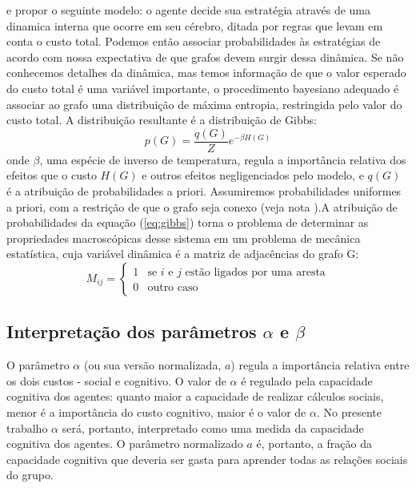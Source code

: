  e propor o seguinte modelo: o agente decide sua estratégia através de uma dinamica interna que ocorre em seu cérebro, ditada por regras que levam em conta o custo total. Podemos então associar probabilidades às estratégias de acordo com nossa expectativa de que grafos devem surgir dessa dinâmica. Se não conhecemos detalhes da dinâmica, mas temos informação de que o valor esperado do custo total é uma variável importante, o procedimento bayesiano adequado é associar ao grafo uma distribuição de máxima entropia, restringida pelo valor do custo total. A distribuição resultante é a distribuição de Gibbs:
\begin{equation}
   \label{eq:gibbs}
   p(G) = \frac{q(G)}{Z} e^{-\beta H(G)}
\end{equation}
onde $\beta$, uma espécie de inverso de temperatura, regula a importância relativa dos efeitos que o custo \(H(G)\) e outros efeitos negligenciados pelo modelo, e \(q(G)\) é a atribuição de probabilidades a priori. Assumiremos probabilidades uniformes a priori, com a restrição de que o grafo seja conexo (veja nota \footnotemark[\value{footnote}]).A atribuição de probabilidades da equação (\ref{eq:gibbs}) torna o problema de determinar as propriedades macroscópicas desse sistema em um problema de mecânica estatística, cuja variável dinâmica é a matriz de adjacências do grafo G:
\begin{equation}
  M_{ij} = \begin{cases}
      1  & \text{se $i$ e $j$ estão ligados por uma aresta} \\
      0  & \text{outro caso}
           \end{cases}
\end{equation}
\subsection{Interpretação dos parâmetros $\alpha$ e $\beta$}

O parâmetro $\alpha$ (ou sua versão normalizada, $a$) regula a importância relativa entre os dois custos - social e cognitivo. O valor de $\alpha$ é regulado pela capacidade cognitiva dos agentes: quanto maior a capacidade de realizar cálculos sociais, menor é a importância do custo cognitivo, maior é o valor de $\alpha$. No presente trabalho $\alpha$ será, portanto, interpretado como uma medida da capacidade cognitiva dos agentes. O parâmetro normalizado $a$ é, portanto, a fração da capacidade cognitiva que deveria ser gasta para aprender todas as relações sociais do grupo. 

